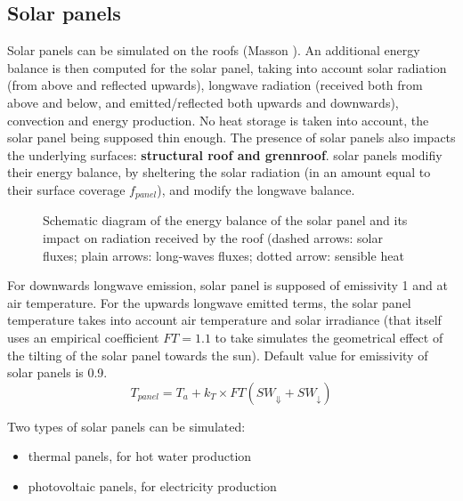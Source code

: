 \subsection{Solar panels}

Solar panels can be simulated on the roofs (Masson \nocite{Masson2014}). An additional energy balance is then computed for the solar panel, taking into account solar radiation (from above and reflected upwards), longwave radiation (received both from above and below, and emitted/reflected both upwards and downwards), convection and energy production. No heat storage is taken into account, the solar panel being supposed thin enough. The presence of solar panels also impacts the underlying surfaces: {\bf structural roof and grennroof}. solar panels modifiy their energy balance, by sheltering the solar radiation (in an amount equal to their surface coverage $f_{panel}$), and modify the longwave balance. \\


\begin{figure}[t]
\hspace*{0.cm}
\caption{Schematic diagram of the energy balance of the solar panel and its impact on radiation received by the roof (dashed arrows: solar fluxes; plain arrows: long-waves fluxes; dotted arrow: sensible heat}
\label{solar}
\end{figure}




For downwards longwave emission, solar panel is supposed of emissivity 1 and at air temperature. For the upwards longwave emitted terms, the solar panel temperature takes into account air temperature and solar irradiance (that itself uses an empirical coefficient $FT=1.1$ to take simulates the geometrical effect of the tilting of the solar panel towards the sun). Default value for emissivity of solar panels is 0.9. \\

\begin{equation}
T_{panel} = T_{a} + k_T \times FT (SW_{\Downarrow} + SW_{\downarrow})
\end{equation}

Two types of solar panels can be simulated:
\begin{itemize}
\item thermal panels, for hot water production
\item photovoltaic panels, for electricity production
\end{itemize}

